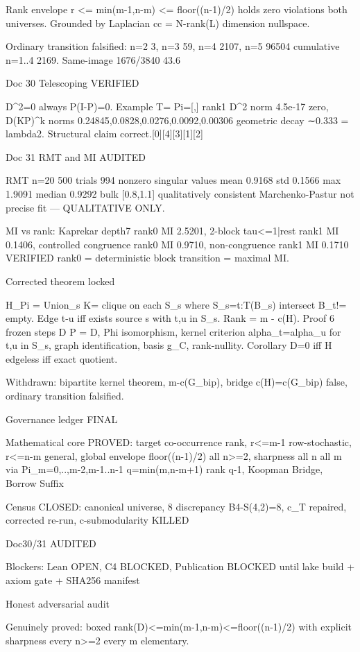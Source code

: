 Rank envelope r <= min(m-1,n-m) <= floor((n-1)/2) holds zero violations both universes. Grounded by Laplacian cc = N-rank(L) dimension nullspace.

Ordinary transition falsified: n=2 3, n=3 59, n=4 2107, n=5 96504 cumulative n=1..4 2169. Same-image 1676/3840 43.6%

Doc 30 Telescoping VERIFIED

D^2=0 always P(I-P)=0. Example T= Pi=[,] rank1 D^2 norm 4.5e-17 zero, D(KP)^k norms 0.24845,0.0828,0.0276,0.0092,0.00306 geometric decay ∼0.333 = lambda2. Structural claim correct.[0][4][3][1][2]

Doc 31 RMT and MI AUDITED

RMT n=20 500 trials 994 nonzero singular values mean 0.9168 std 0.1566 max 1.9091 median 0.9292 bulk [0.8,1.1] qualitatively consistent Marchenko-Pastur not precise fit — QUALITATIVE ONLY.

MI vs rank: Kaprekar depth7 rank0 MI 2.5201, 2-block tau<=1|rest rank1 MI 0.1406, controlled congruence rank0 MI 0.9710, non-congruence rank1 MI 0.1710 VERIFIED rank0 = deterministic block transition = maximal MI.

Corrected theorem locked

H_Pi = Union_s K= clique on each S_s where S_s={t:T(B_s) intersect B_t!= empty}. Edge t-u iff exists source s with t,u in S_s. Rank = m - c(H). Proof 6 frozen steps D P = D, Phi isomorphism, kernel criterion alpha_t=alpha_u for t,u in S_s, graph identification, basis g_C, rank-nullity. Corollary D=0 iff H edgeless iff exact quotient.

Withdrawn: bipartite kernel theorem, m-c(G_bip), bridge c(H)=c(G_bip) false, ordinary transition falsified.

Governance ledger FINAL

Mathematical core PROVED: target co-occurrence rank, r<=m-1 row-stochastic, r<=n-m general, global envelope floor((n-1)/2) all n>=2, sharpness all n all m via Pi_m={{0},..,{m-2},{m-1..n-1}} q=min(m,n-m+1) rank q-1, Koopman Bridge, Borrow Suffix

Census CLOSED: canonical universe, 8 discrepancy B4-S(4,2)=8, c_T repaired, corrected re-run, c-submodularity KILLED

Doc30/31 AUDITED

Blockers: Lean OPEN, C4 BLOCKED, Publication BLOCKED until lake build + axiom gate + SHA256 manifest

Honest adversarial audit

Genuinely proved: boxed rank(D)<=min(m-1,n-m)<=floor((n-1)/2) with explicit sharpness every n>=2 every m elementary.

